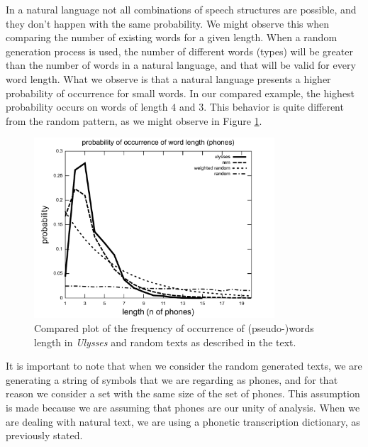 In a natural language not all combinations of speech structures are possible, and they don't happen
with the same probability. We might observe this when comparing the number of existing words for a given
length. When a random generation process is used, the number of different words (types) will be greater  
than the number of words in a natural language, and that will be valid for every word length.
What we observe is that a natural language presents a higher probability of occurrence for small
words. In our compared example, the highest probability occurs on words of length $4$ and $3$.
This behavior is quite different from the random pattern, as we might observe in Figure
\ref{fig:ulysses_compared_word_length_probabilities}.


\begin{figure}[h]
\centering  
\includegraphics[width=0.8\textwidth]{images/ulysses_compared_word_length_probabilities.pdf}  
\caption{Compared plot of the frequency of occurrence of (pseudo-)words length in \textit{Ulysses} and random texts as described in the text.}
\label{fig:ulysses_compared_word_length_probabilities}  
\end{figure} 

It is important to note that when we consider the random generated texts, we are generating a
string of symbols that we are regarding as phones, and for that reason we consider a set with
the same size of the set of phones. This assumption is made because we are assuming that phones
are our unity of analysis. When we are dealing with natural text, we are using a phonetic
transcription dictionary, as previously stated.

